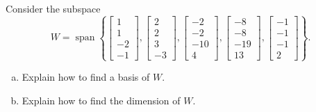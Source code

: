 
\begin{exerciseStatement}


Consider the subspace \[W=\operatorname{span}  \left\{ \left[\begin{array}{c}
1 \\
1 \\
-2 \\
-1
\end{array}\right] , \left[\begin{array}{c}
2 \\
2 \\
3 \\
-3
\end{array}\right] , \left[\begin{array}{c}
-2 \\
-2 \\
-10 \\
4
\end{array}\right] , \left[\begin{array}{c}
-8 \\
-8 \\
-19 \\
13
\end{array}\right] , \left[\begin{array}{c}
-1 \\
-1 \\
-1 \\
2
\end{array}\right] \right\} .\]


\begin{enumerate}[(a)]
\item  Explain how to find a basis of \(W\).
\item  Explain how to find the dimension of \(W\).
\end{enumerate}
    
\end{exerciseStatement}
    
